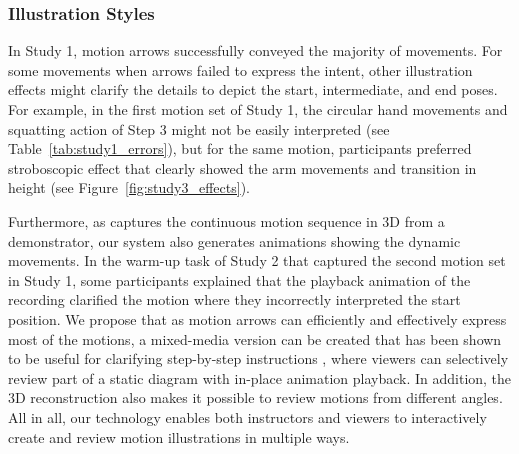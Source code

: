\subsubsection{Illustration Styles}
In Study 1, motion arrows successfully conveyed the majority of movements. For some movements when arrows failed to express the intent, other illustration effects might clarify the details to depict the start, intermediate, and end poses. For example, in the first motion set of Study 1, the circular hand movements and squatting action of Step 3 might not be easily interpreted (see Table~\ref{tab:study1_errors}), but for the same motion, participants preferred stroboscopic effect that clearly showed the arm movements and transition in height (see Figure~\ref{fig:study3_effects}).

Furthermore, as \systemname{} captures the continuous motion sequence in 3D from a demonstrator, our system also generates animations showing the dynamic movements.
%
In the warm-up task of Study 2 that captured the second motion set in Study 1, some participants explained that the playback animation of the recording clarified the motion where they incorrectly interpreted the start position.
%
We propose that as motion arrows can efficiently and effectively express most of the motions, a mixed-media version can be created that has been shown to be useful for clarifying step-by-step instructions \cite{Chi:2012:MAG:2380116.2380130}, where viewers can selectively review part of a static diagram with in-place animation playback. In addition, the 3D reconstruction also makes it possible to review motions from different angles.
%
All in all, our technology enables both instructors and viewers to interactively create and review motion illustrations in multiple ways.
